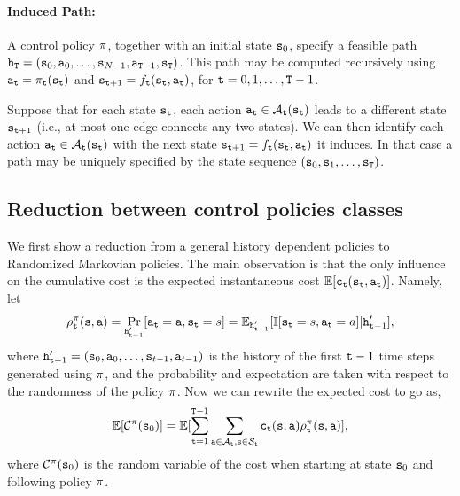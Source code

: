 \paragraph{Induced Path:}
A control policy $\pi $, together with an initial state
${{\tt s}_0}$, specify a feasible path ${{\tt h}_{\tt T}} =
({{\tt s}_0},{{\tt a}_0}, \ldots ,{{\tt s}_{N -
1}},{{\tt a}_{{\tt T} - 1}},{{\tt s}_{\tt T}})$. This path may be
computed recursively using ${{\tt a}_{{\tt t}}} = {\pi
_{{\tt t}}}({{\tt s}_{{\tt t}}})$ and ${{\tt s}_{{\tt t} + 1}} =
{f_{{\tt t}}}({{\tt s}_{{\tt t}}},{{\tt a}_{{\tt t}}})$, for ${\tt t} =
0,1, \ldots ,{\tt T} - 1$.

\begin{remark}
Suppose that for each state ${{\tt s}_{{\tt t}}}$, each action
${{\tt a}_{{\tt t}}} \in {\mathcal{A}_{{\tt t}}}({{\tt s}_{{\tt t}}})$
leads to a different state ${{\tt s}_{{\tt t} + 1}}$ (i.e., at most
one edge connects any two states). We can then identify each action
${{\tt a}_{{\tt t}}} \in {\mathcal{A}_{{\tt t}}}({\tt s}_{{\tt t}})$ with
the next state ${{\tt s}_{{\tt t} + 1}} =
{f_{{\tt t}}}({\tt s}_{{\tt t}},{{\tt a}_{{\tt t}}})$ it induces. In
that case a path may be uniquely specified by the state sequence
$({{\tt s}_0},{{\tt s}_1}, \ldots ,{{\tt s}_{\tt T}})$.
\end{remark}


\subsection{Reduction between control policies classes}

We first show a reduction from a general history dependent policies
to Randomized Markovian policies. The main observation is that the
only influence on the cumulative cost is the expected instantaneous
cost $\mathbb{E}[{\tt c}_{\tt t}({\tt s}_{\tt t},{\tt a}_{\tt t})]$. Namely, let
\[
\rho^\pi_{\tt t}({\tt s},{\tt a})=\Pr_{{\tt h}'_{{\tt t}-1}}
[{\tt a}_{\tt t}={\tt a},{\tt s}_{\tt t}=s]=\mathbb{E}_{{\tt h}'_{{\tt t}-1}}[\mathbb{I}
[{\tt s}_{\tt t}=s,{\tt a}_{\tt t}=a]| {\tt h}'_{{\tt t}-1}],
\]
where
${\tt h}'_{{\tt t}-1}=({\tt s}_0,{\tt a}_0,\ldots,{\tt s}_{t-1},{\tt a}_{t-1})$
is the history of the first ${\tt t}-1$ time steps generated using
$\pi$, and the probability and expectation are taken with
respect to the randomness of the policy $\pi$. Now we can
rewrite the expected cost to go as,
\[
\mathbb{E}[\mathcal{C}^\pi({\tt s}_0)]=\mathbb{E}[\sum_{{\tt t}=1}^{{\tt T}-1}
\sum_{{\tt a}\in \mathcal{A}_{\tt t},{\tt s}\in \mathcal{S}_{\tt t}}
{\tt c}_{\tt t}({\tt s},{\tt a})\rho^\pi_{\tt t}({\tt s},{\tt a})],
\]
where $\mathcal{C}^\pi({\tt s}_0)$ is the random variable of the cost
when starting at state ${\tt s}_0$ and following policy $\pi$.

